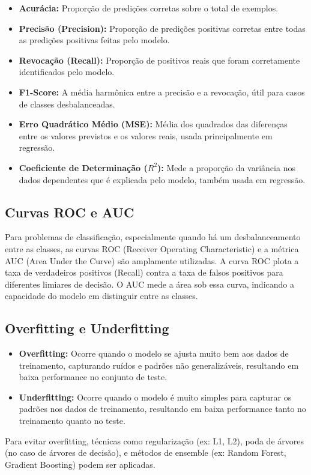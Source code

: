 \documentclass{article}
\begin{document}
\begin{itemize}
    \item \textbf{Acurácia:} Proporção de predições corretas sobre o total de exemplos.
    \item \textbf{Precisão (Precision):} Proporção de predições positivas corretas entre todas as predições positivas feitas pelo modelo.
    \item \textbf{Revocação (Recall):} Proporção de positivos reais que foram corretamente identificados pelo modelo.
    \item \textbf{F1-Score:} A média harmônica entre a precisão e a revocação, útil para casos de classes desbalanceadas.
    \item \textbf{Erro Quadrático Médio (MSE):} Média dos quadrados das diferenças entre os valores previstos e os valores reais, usada principalmente em regressão.
    \item \textbf{Coeficiente de Determinação (\(R^2\)):} Mede a proporção da variância nos dados dependentes que é explicada pelo modelo, também usada em regressão.
\end{itemize}

\subsection{Curvas ROC e AUC}

Para problemas de classificação, especialmente quando há um desbalanceamento entre as classes, as curvas ROC (Receiver Operating Characteristic) e a métrica AUC (Area Under the Curve) são amplamente utilizadas. A curva ROC plota a taxa de verdadeiros positivos (Recall) contra a taxa de falsos positivos para diferentes limiares de decisão. O AUC mede a área sob essa curva, indicando a capacidade do modelo em distinguir entre as classes.

\subsection{Overfitting e Underfitting}

\begin{itemize}
    \item \textbf{Overfitting:} Ocorre quando o modelo se ajusta muito bem aos dados de treinamento, capturando ruídos e padrões não generalizáveis, resultando em baixa performance no conjunto de teste.
    \item \textbf{Underfitting:} Ocorre quando o modelo é muito simples para capturar os padrões nos dados de treinamento, resultando em baixa performance tanto no treinamento quanto no teste.
\end{itemize}

Para evitar overfitting, técnicas como regularização (ex: L1, L2), poda de árvores (no caso de árvores de decisão), e métodos de ensemble (ex: Random Forest, Gradient Boosting) podem ser aplicadas.
\end{document}
